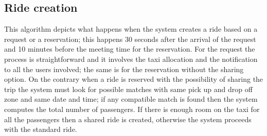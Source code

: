 \documentclass[a4paper,11pt]{report} %
\begin{document}
	\pagebreak
	
	\subsection{Ride creation}
	This algorithm depicts what happens when the system creates a ride based on a request or a reservation; this happens 30 seconds after the arrival of the request and 10 minutes before the meeting time for the reservation. For the request the process is straightforward and it involves the taxi allocation and the notification to all the users involved; the same is for the reservation without the sharing option. On the contrary when a ride is reserved with the possibility of sharing the trip the system must look for possible matches with same pick up and drop off zone and same date and time; if any compatible match is found then the system computes the total number of passengers. If there is enough room on the taxi for all the passengers then a shared ride is created, otherwise the system proceeds with the standard ride.\\
	
\end{document}
